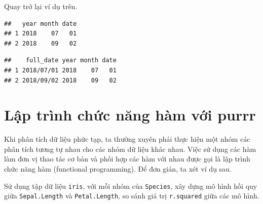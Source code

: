 \documentclass[]{krantz}
\makeatletter
\newenvironment{Shaded}{\begin{snugshade}}{\end{snugshade}}
\newcommand{\CommentTok}[1]{\textcolor[rgb]{0.37,0.37,0.37}{\textit{#1}}}
\newcommand{\DataTypeTok}[1]{\textcolor[rgb]{0.27,0.27,0.27}{#1}}
\newcommand{\DecValTok}[1]{\textcolor[rgb]{0.06,0.06,0.06}{#1}}
\newcommand{\KeywordTok}[1]{\textcolor[rgb]{0.27,0.27,0.27}{\textbf{#1}}}
\newcommand{\NormalTok}[1]{#1}
\newcommand{\OperatorTok}[1]{\textcolor[rgb]{0.43,0.43,0.43}{\textbf{#1}}}
\newcommand{\StringTok}[1]{\textcolor[rgb]{0.5,0.5,0.5}{#1}}
\newenvironment{kframe}{%
\medskip{}
\setlength{\fboxsep}{.8em}
 \def\at@end@of@kframe{}%
 \ifinner\ifhmode%
  \def\at@end@of@kframe{\end{minipage}}%
  \begin{minipage}{\columnwidth}%
 \fi\fi%
 \def\FrameCommand##1{\hskip\@totalleftmargin \hskip-\fboxsep
 \colorbox{shadecolor}{##1}\hskip-\fboxsep
     \hskip-\linewidth \hskip-\@totalleftmargin \hskip\columnwidth}%
 \MakeFramed {\advance\hsize-\width
   \@totalleftmargin\z@ \linewidth\hsize
   \@setminipage}}%
 {\par\unskip\endMakeFramed%
 \at@end@of@kframe}
\renewenvironment{Shaded}{\begin{kframe}}{\end{kframe}}
\renewenvironment{Shaded}{\begin{snugshade}}{\end{snugshade}}
\renewcommand{\CommentTok}[1]{\textcolor[rgb]{0.56,0.35,0.01}{\textit{#1}}}
\renewcommand{\DataTypeTok}[1]{\textcolor[rgb]{0.13,0.29,0.53}{#1}}
\renewcommand{\DecValTok}[1]{\textcolor[rgb]{0.00,0.00,0.81}{#1}}
\renewcommand{\KeywordTok}[1]{\textcolor[rgb]{0.13,0.29,0.53}{\textbf{#1}}}
\renewcommand{\NormalTok}[1]{#1}
\renewcommand{\OperatorTok}[1]{\textcolor[rgb]{0.81,0.36,0.00}{\textbf{#1}}}
\renewcommand{\StringTok}[1]{\textcolor[rgb]{0.31,0.60,0.02}{#1}}
\theoremstyle{definition}
\theoremstyle{definition}
\theoremstyle{definition}
\theoremstyle{remark}
\makeatother
\begin{document}
Quay trở lại ví dụ trên.

\begin{Shaded}
\end{Shaded}

\begin{verbatim}
##   year month date
## 1 2018    07   01
## 2 2018    09   02
\end{verbatim}

\begin{Shaded}
\end{Shaded}

\begin{verbatim}
##    full_date year month date
## 1 2018/07/01 2018    07   01
## 2 2018/09/02 2018    09   02
\end{verbatim}

\hypertarget{lp-trinh-chc-nang-ham-vi-purrr}{%
\chapter{Lập trình chức năng hàm với
purrr}\label{lp-trinh-chc-nang-ham-vi-purrr}}

Khi phân tích dữ liệu phức tạp, ta thường xuyên phải thực hiện một nhóm
các phân tích tương tự nhau cho các nhóm dữ liệu khác nhau. Việc sử dụng
các hàm làm đơn vị thao tác cơ bản và phối hợp các hàm với nhau được gọi
là lập trình chức năng hàm (functional programming). Để đơn giản, ta xét
ví dụ sau.

Sử dụng tập dữ liệu \texttt{iris}, với mỗi nhóm của \texttt{Species},
xây dựng mô hình hồi quy giữa \texttt{Sepal.Length} và
\texttt{Petal.Length}, so sánh giá trị \texttt{r.squared} giữa các mô
hình.
\end{document}
